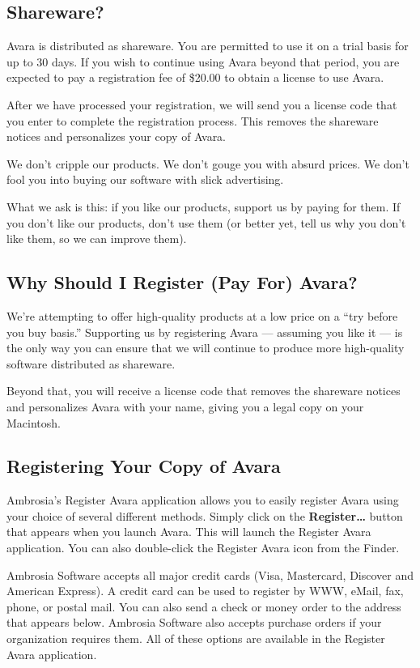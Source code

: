 \documentclass{article}
\begin{document}
\subsection{Shareware?}
Avara is distributed as shareware. You are permitted to use it on a trial basis for up to 30 days. If you wish to continue using Avara beyond that period, you are expected to pay a registration fee of \$20.00 to obtain a license to use Avara.

After we have processed your registration, we will send you a license code that you enter to complete the registration process. This removes the shareware notices and personalizes your copy of Avara.

We don't cripple our products. We don't gouge you with absurd prices. We don't fool you into buying our software with slick advertising.

What we ask is this: if you like our products, support us by paying for them. If you don't like our products, don't use them (or better yet, tell us why you don't like them, so we can improve them).

\subsection{Why Should I Register (Pay For) Avara?}
We're attempting to offer high-quality products at a low price on a ``try before you buy basis.'' Supporting us by registering Avara --- assuming you like it --- is the only way you can ensure that we will continue to produce more high-quality software distributed as shareware.

Beyond that, you will receive a license code that removes the shareware notices and personalizes Avara with your name, giving you a legal copy on your Macintosh.

\subsection{Registering Your Copy of Avara}
Ambrosia's Register Avara application allows you to easily register Avara using your choice of several different methods. Simply click on the \textbf{Register\dots} button that appears when you launch Avara. This will launch the Register Avara application. You can also double-click the Register Avara icon from the Finder.

Ambrosia Software accepts all major credit cards (Visa, Mastercard, Discover and American Express). A credit card can be used to register by WWW, eMail, fax, phone, or postal mail. You can also send a check or money order to the address that appears below. Ambrosia Software also accepts purchase orders if your organization requires them. All of these options are available in the Register Avara application.
\end{document}
